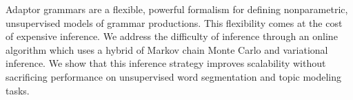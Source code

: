 Adaptor  grammars  are                    a  flexible,  powerful formalism            for defining nonparametric,                     unsupervised  models  of  grammar        productions. This flexibility comes at the cost of expensive inference.  We address the difficulty of inference through an online algorithm which uses a  hybrid  of Markov                    chain  Monte  Carlo  and variational  inference.             We show  that this inference strategy improves scalability without sacrificing performance on unsupervised word segmentation and topic modeling tasks.
